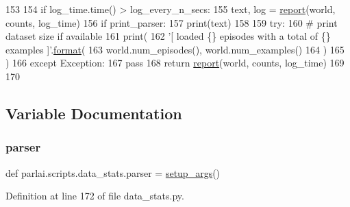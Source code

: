 \begin{DoxyCode}
153 
154         \textcolor{keywordflow}{if} log\_time.time() > log\_every\_n\_secs:
155             text, log = \hyperlink{namespaceparlai_1_1scripts_1_1data__stats_a8cc2308cc735ce6cf029d4c02fea5a21}{report}(world, counts, log\_time)
156             \textcolor{keywordflow}{if} print\_parser:
157                 print(text)
158 
159     \textcolor{keywordflow}{try}:
160         \textcolor{comment}{# print dataset size if available}
161         print(
162             \textcolor{stringliteral}{'[ loaded \{\} episodes with a total of \{\} examples ]'}.\hyperlink{namespaceparlai_1_1chat__service_1_1services_1_1messenger_1_1shared__utils_a32e2e2022b824fbaf80c747160b52a76}{format}(
163                 world.num\_episodes(), world.num\_examples()
164             )
165         )
166     \textcolor{keywordflow}{except} Exception:
167         \textcolor{keywordflow}{pass}
168     \textcolor{keywordflow}{return} \hyperlink{namespaceparlai_1_1scripts_1_1data__stats_a8cc2308cc735ce6cf029d4c02fea5a21}{report}(world, counts, log\_time)
169 
170 
\end{DoxyCode}


\subsection{Variable Documentation}
\mbox{\label{namespaceparlai_1_1scripts_1_1data__stats_af1cc1fdf5289b1dfc8277f9de43ff109}} 
\subsubsection{\texorpdfstring{parser}{parser}}
{\footnotesize\ttfamily def parlai.\+scripts.\+data\+\_\+stats.\+parser = \hyperlink{namespaceparlai_1_1scripts_1_1data__stats_add47fb96d75895f4c21d9e310cb1df40}{setup\+\_\+args}()}



Definition at line 172 of file data\+\_\+stats.\+py.

\mbox{\label{namespaceparlai_1_1scripts_1_1data__stats_a89286b21a94125aadf5cc8571abe3f7f}} 

